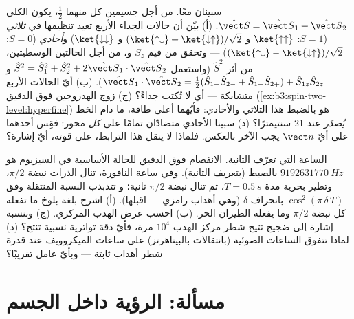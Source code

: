 \begin{exercise}[$\star\star\star$]\label{exo:b3:spin-two-level:11}
سبينان معًا. من أجل جسيمين  كل منهما $\tfrac12$، يكون 
الكلي $\hat{\vect S} = \hat{\vect S}_1 + \hat{\vect S}_2$. (أ) بيّن
أن حالات الجداء الأربع تعيد تنظيمها في \emph{ثلاثي} ($S = 1$:
$\ket{\uparrow\uparrow}$ و $(\ket{\uparrow\downarrow} +
\ket{\downarrow\uparrow})/\sqrt2$ و $\ket{\downarrow\downarrow}$)
و\emph{أحادي} ($S = 0$: $(\ket{\uparrow\downarrow} -
\ket{\downarrow\uparrow})/\sqrt2$) --- وتحقق من قيم $S_z$ و،
من أجل الحالتين الوسطيتين، من أثر $\hat S^2$ (واستعمل $\hat
S^2 = \hat S_1^2 + \hat S_2^2 + 2\hat{\vect S}_1\cdot\hat{\vect
S}_2$ و $\hat{\vect S}_1\cdot\hat{\vect S}_2 = \tfrac12(\hat
S_{1+}\hat S_{2-} + \hat S_{1-}\hat S_{2+}) + \hat S_{1z}\hat
S_{2z}$). (ب) أيّ الحالات الأربع متشابكة --- أي لا تُكتب
جداءً؟ (ج) زوج الهدروجين فوق الدقيق
(\cref{ex:b3:spin-two-level:hyperfine}) هو بالضبط هذا
الثلاثي والأحادي: فأيّهما أعلى طاقة، ما دام الخط
\emph{يُصدَر} عند 21 سنتيمترًا؟ (د) سبينا الأحادي متضادّان تمامًا
على \emph{كل} محور: فقِس أحدهما على أيّ
$\vect n$ يجب الآخر بالعكس. فلماذا لا ينقل هذا
الترابط، على قوته، أيّ إشارة؟
\end{exercise}

\begin{exercise}[$\star\star\star$]\label{exo:b3:spin-two-level:12}
الساعة التي تعرّف الثانية. الانفصام فوق الدقيق للحالة الأساسية
في السيزيوم هو $\qty{9192631770}{Hz}$ بالضبط (بتعريف
الثانية). وفي ساعة النافورة، تنال الذرات نبضة $\pi/2$، وتطير بحرية
مدة $T = \qty{0.5}{s}$، ثم تنال نبضة $\pi/2$ ثانية؛ و
تتذبذب النسبة المنتقلة وفق $\cos^2(\pi\,\delta\,T)$ بانحراف
$\delta$ (وهي أهداب رامزي --- اقبلها). (أ) اشرح
بلغة بلوخ ما تفعله كل نبضة $\pi/2$ وما يفعله الطيران الحر. (ب)
احسب عرض الهدب المركزي. (ج) وبنسبة إشارة إلى ضجيج تتيح
شطر مركز الهدب $10^4$ مرة، فأيّ دقة تواترية نسبية تنتج؟
(د) لماذا تتفوق الساعات الضوئية (بانتقالات بالبيتاهرتز) على
ساعات الميكروويف عند قدرة شطر أهداب ثابتة --- وبأيّ عامل تقريبًا؟
\end{exercise}

\section{مسألة: الرؤية داخل الجسم}

